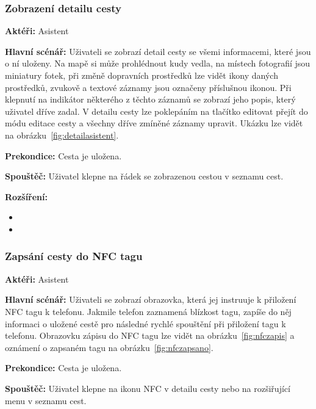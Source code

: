 \documentclass{article}
\newcommand{\usecase}[2]{\subsubsection{#1}\label{#2}}
\begin{document}
\usecase{Zobrazení detailu cesty}{detailasistent}
\textbf{Aktéři:} Asistent

\vspace{0.1cm}
\noindent
\textbf{Hlavní scénář:} Uživateli se zobrazí detail cesty se všemi informacemi, které jsou o ní uloženy.
Na mapě si může prohlédnout kudy vedla, na místech fotografií jsou miniatury fotek, při změně dopravních
prostředků lze vidět ikony daných prostředků, zvukově a textové záznamy jsou označeny příslušnou ikonou.
Při klepnutí na indikátor některého z těchto záznamů se zobrazí jeho popis, který uživatel dříve zadal.
V detailu cesty lze poklepáním na tlačítko editovat přejít do módu editace cesty a všechny dříve zmíněné
záznamy upravit. Ukázku lze vidět na obrázku~\ref{fig:detailasistent}.

\vspace{0.1cm}
\noindent
\textbf{Prekondice:} Cesta je uložena.

\vspace{0.1cm}
\noindent
\textbf{Spouštěč:} Uživatel klepne na řádek se zobrazenou cestou v seznamu cest.

\vspace{0.1cm}
\noindent
\textbf{Rozšíření:}
\begin{itemize}
  \item {}
  \item {}
\end{itemize}






\usecase{Zapsání cesty do NFC tagu}{nfczapis}
\textbf{Aktéři:} Asistent

\vspace{0.1cm}
\noindent
\textbf{Hlavní scénář:} Uživateli se zobrazí
obrazovka, která jej instruuje k přiložení NFC tagu k telefonu. Jakmile telefon zaznamená blízkost tagu,
zapíše do něj informaci o uložené cestě pro následné rychlé spouštění při přiložení tagu k telefonu.
Obrazovku zápisu do NFC tagu lze vidět na obrázku~\ref{fig:nfczapis} a oznámení o zapsaném tagu
na obrázku~\ref{fig:nfczapsano}.

\vspace{0.1cm}
\noindent
\textbf{Prekondice:} Cesta je uložena.

\vspace{0.1cm}
\noindent
\textbf{Spouštěč:} Uživatel klepne na ikonu NFC v detailu cesty nebo na rozšiřující menu v seznamu cest.
\end{document}
